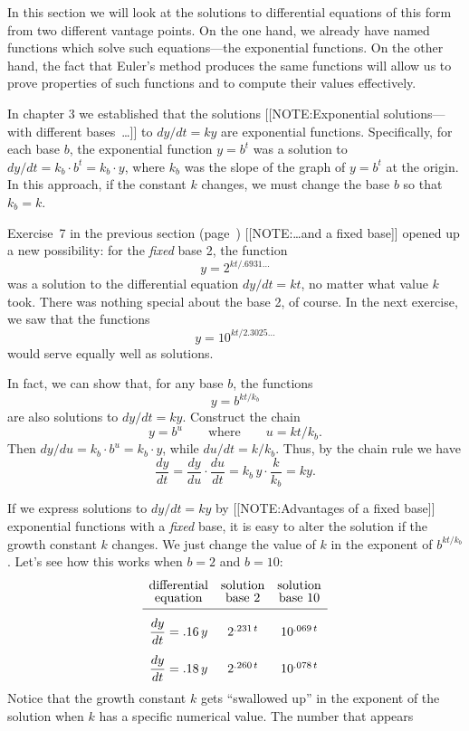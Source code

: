 In this section we will look at the solutions to differential
equations of this form from two different vantage points.  On the one
hand, we already have named functions which solve such equations---the
exponential functions.  On the other hand, the fact that Euler's
method produces the same functions will allow us to prove properties
of such functions and to compute their values effectively.

In chapter 3 we established that the solutions 
[[NOTE:Exponential solutions---with different bases~\ldots]]
to $dy/dt = ky$ are exponential functions.
Specifically, for each base $b$, the exponential function $y = b^t$
was a solution to $dy/dt = k_b \cdot b^t = k_b \cdot y$, where $k_b$
was the slope of the graph of $y = b^t$ at the origin.  In this
approach, if the constant $k$ changes, we must change the base $b$ so
that $k_b = k$.


Exercise~7 in the previous section (page~\pageref{ex:base 2}) 
[[NOTE:\ldots and a  fixed base]] 
opened up a new possibility: for the {\em fixed\/} base 2, the
function
	\[
y = 2^{kt/.6931\ldots}
\]
was a solution to the differential equation $dy/dt = kt$, no matter what value $k$ took.  There was nothing special about the base 2, of course.  In the next exercise, we saw that the functions
	\[
y = 10^{kt/2.3025\ldots}
\]
would serve equally well as solutions.  

	In fact, we can show that, for any base $b$, the functions
	\[
y = b^{kt/k_b}
\]
are also solutions to $dy/dt = ky$.  Construct the chain
	\[
y = b^u \qquad \mbox{where} \qquad u = kt/k_b.
\]
Then $dy/du = k_b\cdot b^u = k_b\cdot y$, while $du/dt = k/k_b$.  Thus, by the chain rule we have
	\[
\dfrac{dy}{dt} = \dfrac{dy}{du} \cdot \dfrac{du}{dt} =
		k_b\, y \cdot \dfrac{k}{k_b} = k y.
\]

If we express solutions to $dy/dt = ky$ by 
[[NOTE:Advantages of a  fixed base]]
exponential functions with a {\em fixed\/} base, it is easy to alter the solution if the growth constant $k$ changes.  We just change the value of $k$ in the exponent of $b^{kt/k_b}$.  Let's see how this works when $b = 2$ and $b = 10$:
\addtolength{\arraycolsep}{6pt}
	\[
\begin{array}{ccc}
	\mbox{differential} & \mbox{solution} & 
		\mbox{solution} \\[-2pt]
	\mbox{equation} & \mbox{base 2} & 
		\mbox{base 10}  \\[2pt] \hline
	\dfrac{dy}{dt} = .16 \, y &
		\rule{0pt}{21pt} 2^{.231\,t} \rule{0pt}{21pt} &
		10^{.069\,t} \\ [12pt]
	\dfrac{dy}{dt} = .18 \, y &
		2^{.260\,t} & 10^{.078\,t}
	\end{array}
\]
Notice that the growth constant $k$ gets ``swallowed up'' in the
exponent of the solution when $k$ has a specific numerical value.  The
number that appears\linebreak

